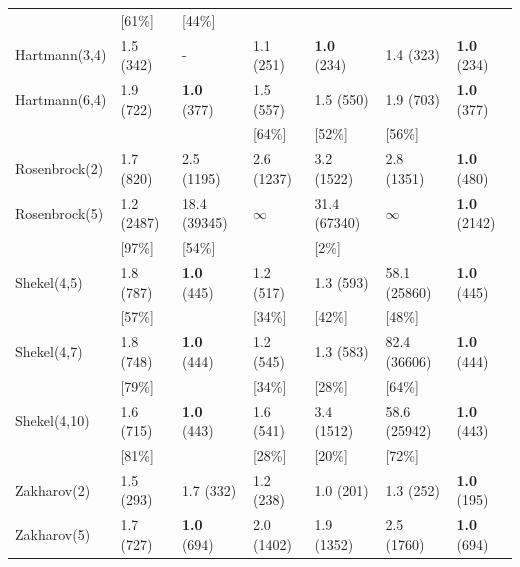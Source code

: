 \documentclass[fontsize=12, a4aper]{scrartcl}
\begin{document}
\begin{table}[H]
\begin{tabularx}{\linewidth}{ l l l l l l l}
			& [61\%] & [44\%] & & & & \\
			
			Hartmann(3,4) & 1.5 (342) & - & 1.1 (251) & \textbf{1.0} (234) & 1.4 (323) & \textbf{1.0} (234)\\
			
			Hartmann(6,4) & 1.9 (722) & \textbf{1.0} (377) & 1.5 (557) & 1.5 (550) & 1.9 (703) & \textbf{1.0} (377)\\
			
			& & & [64\%] & [52\%] & [56\%] & \\
			
			Rosenbrock(2) & 1.7 (820) & 2.5 (1195) & 2.6 (1237) & 3.2 (1522) & 2.8 (1351) & \textbf{1.0} (480)\\
			
			Rosenbrock(5) & 1.2 (2487) & 18.4 (39345) & \(\infty\) & 31.4 (67340) & \(\infty\) & \textbf{1.0} (2142)\\
			
			& [97\%] & [54\%] & & [2\%] & & \\
			
			Shekel(4,5) & 1.8 (787) & \textbf{1.0} (445) & 1.2 (517) & 1.3 (593) & 58.1 (25860) & \textbf{1.0} (445) \\
			
			& [57\%] & & [34\%] & [42\%] & [48\%] & \\
			
			Shekel(4,7) & 1.8 (748) & \textbf{1.0} (444) & 1.2 (545) & 1.3 (583) & 82.4 (36606) & \textbf{1.0} (444) \\
			
			 & [79\%] & & [34\%] & [28\%] & [64\%] & \\
			
			Shekel(4,10) & 1.6 (715) & \textbf{1.0} (443) & 1.6 (541) & 3.4 (1512) & 58.6 (25942) & \textbf{1.0} (443) \\
			
			 & [81\%] & & [28\%] & [20\%] & [72\%] & \\
			
			Zakharov(2) & 1.5 (293) & 1.7 (332) & 1.2 (238) & 1.0 (201) & 1.3 (252) & \textbf{1.0} (195) \\
			
			Zakharov(5) & 1.7 (727) & \textbf{1.0} (694) & 2.0 (1402) & 1.9 (1352) & 2.5 (1760) & \textbf{1.0} (694)\\
			
			\bottomrule
			
		\end{tabularx}
		

\end{table}
\end{document}
